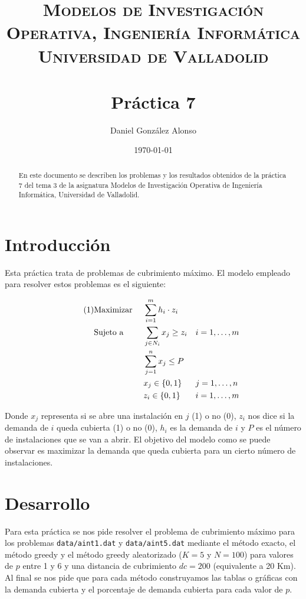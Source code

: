 \documentclass[a4paper,11pt]{article}
\title{
	\vspace{-25pt}
	\normalfont \Large \textsc{
		Modelos de Investigación Operativa,
        Ingeniería Informática\\
        Universidad de Valladolid
	}\\[10pt]
	\horrule{1pt}\\[10pt]
	\huge \textbf{
		Práctica 7
	}\\
	\horrule{1pt}
}
\author{
	\normalfont \Large Daniel González Alonso
}
\date{
	\normalfont \large \today
}
\newcommand\numberthis{							%
	\addtocounter{equation}{1}\tag{\theequation}
}
\begin{document}
\maketitle

\begin{abstract}
	En este documento se describen los problemas y los resultados obtenidos de la práctica 7 del tema 3 de la asignatura Modelos de Investigación Operativa de Ingeniería Informática, Universidad de Valladolid.
\end{abstract}

\section{Introducción}
Esta práctica trata de problemas de cubrimiento máximo. El modelo empleado para resolver estos problemas es el siguiente:

\begin{align*}\numberthis
   	&\textrm{Maximizar }	&& \sum_{i=1}^{m}{h_i \cdot z_i}		&&				\\
   	&\textrm{Sujeto a }		&& \sum_{j \in N_{i}}{x_j} \geq z_i 	&& i=1,\ldots,m \\
    &						&& \sum_{j=1}^{n}{x_j} \leq P			&&				\\
	&						&& x_{j} \in \{0,1\}					&& j=1,\ldots,n \\
	&						&& z_{i} \in \{0,1\}					&& i=1,\ldots,m \\
\end{align*}

Donde ${x_j}$ representa si se abre una instalación en ${j}$ (1) o no (0), ${z_i}$ nos dice si la demanda de ${i}$ queda cubierta (1) o no (0), ${h_i}$ es la demanda de ${i}$ y ${P}$ es el número de instalaciones que se van a abrir. El objetivo del modelo como se puede observar es maximizar la demanda que queda cubierta para un cierto número de instalaciones.

\newpage
\section{Desarrollo}

Para esta práctica se nos pide resolver el problema de cubrimiento máximo para los problemas \texttt{data/aint1.dat} y \texttt{data/aint5.dat} mediante el método exacto, el método greedy y el método greedy aleatorizado (${K=5}$ y ${N=100}$) para valores de ${p}$ entre 1 y 6 y una distancia de cubrimiento ${dc=200}$ (equivalente a 20 Km). Al final se nos pide que para cada método construyamos las tablas o gráficas con la demanda cubierta y el porcentaje de demanda cubierta para cada valor de ${p}$.\\
\end{document}
